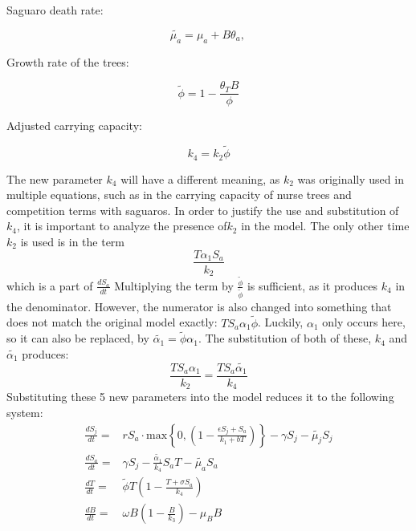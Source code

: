 \documentclass[a4paper]{article}
\begin{document}
\centerline{Saguaro death rate:}
\begin{equation}
\tilde{\mu_{a}} = \mu_a + B \theta_a\text{, }
\end{equation}
\centerline{Growth rate of the trees:}
\begin{equation}
\tilde{\phi} = 1 - \displaystyle\frac{\theta_T B}{\phi}
\end{equation}
\centerline{Adjusted carrying capacity:}
\begin{equation}
k_4 = k_2 \tilde{\phi}
\end{equation}


The new parameter $k_4$ will have a different meaning, as $k_2$ was originally used in multiple equations, such as in the carrying capacity of nurse trees and competition terms with saguaros. In order to justify the use and substitution of $k_4$, it is important to analyze the presence of$k_2$ in the model. 
\newline
The only other time $k_2$ is used is in the term $$\displaystyle\frac{T \alpha_1 S_a}{k_2}$$ which is a part of $\displaystyle\frac{dS_a}{dt}$
Multiplying the term by $\displaystyle\frac{\tilde{\phi}}{\tilde{\phi}}$ is sufficient, as it produces $k_4$ in the denominator. However, the numerator is also changed into something that does not match the original model exactly: $T S_a \alpha_1 \tilde{\phi}$. Luckily, $\alpha_1$ only occurs here, so it can also be replaced, by $\tilde{\alpha_1} = \tilde{\phi} \alpha_1$. The substitution of both of these, $k_4$ and $\tilde{\alpha_1}$ produces:
$$\displaystyle\frac{T S_a \alpha_1}{k_2} = \displaystyle\frac{T S_a \tilde{\alpha_1}}{k_4}$$
Substituting these 5 new parameters into the model reduces it to the following system:
\begin{eqnarray}
\displaystyle\frac{dS_j}{dt}=& rS_a\cdot \text{max}\left \{0,\left(1-\displaystyle\frac{\epsilon S_j + S_a}{k_1+b T}\right)\right \} - \gamma S_j - \tilde{\mu_{j}} S_j \\
\displaystyle\frac{dS_a}{dt} =& \gamma S_j -\displaystyle\frac{\tilde{\alpha_1}}{k_4}S_a T - \tilde{\mu_a} S_a \\
\displaystyle\frac{dT}{dt} =& \tilde{\phi}T\left(1 - \displaystyle\frac{T + \sigma S_a}{k_4}\right) \\
\displaystyle\frac{dB}{dt} =&\omega B \left(1-\displaystyle\frac{B}{k_3}\right) - \mu_B B
\end{eqnarray}
 
\end{document}

